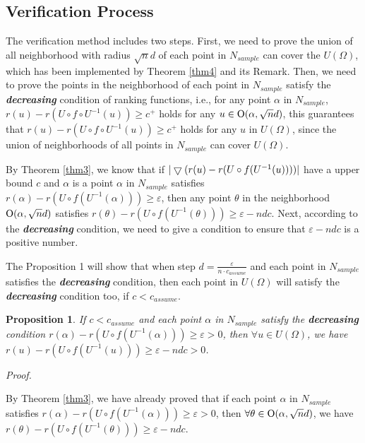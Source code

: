 \subsection{Verification Process} 
\label{Verification Process}
The verification method includes two steps. First, we need to prove the union of all neighborhood with radius $\sqrt n d$ of each point in $N_{sample}$ can cover the $U(\Omega )$, which has been implemented by Theorem \ref{thm4} and its Remark. Then, we need to prove the points in the neighborhood of each point in $N_{sample}$ satisfy the \textbf{\emph{decreasing}} condition of ranking functions, i.e., for any point $\alpha$ in $N_{sample}$, $r(u) - r(U \circ f \circ {U^{ - 1}}(u)) \ge c^+ $ holds for any $u \in {\rm O}(\alpha,\sqrt n d)$, this guarantees that $r(u) - r(U \circ f \circ {U^{ - 1}}(u)) \ge c^+ $ holds for any $u$ in $U(\Omega)$, since the union of neighborhoods of all points in $N_{sample}$ can cover $U(\Omega)$.

By Theorem \ref{thm3}, we know that if ${\rm{|}}\bigtriangledown(r(u) - r(U \circ f({U^{ - 1}}(u))))|$ have a upper bound $c$ and $\alpha$ is a point $\alpha $ in $N_{sample}$ satisfies $r(\alpha) - r(U \circ f({U^{ - 1}}(\alpha)))\ge \varepsilon$, then any point $\theta $ in the neighborhood ${\rm O}(\alpha,\sqrt n d)$ satisfies $r(\theta) - r(U \circ f({U^{ - 1}}(\theta)))\ge\varepsilon-ndc$. Next, according to the \textbf{\emph{decreasing}} condition, we need to give a condition to ensure that $\varepsilon-ndc$ is a positive number. 

The Proposition 1 will show that when step $d = \frac{\varepsilon }{{n\cdot{c_{assume}}}}$ and each point in ${N_{sample}}$ satisfies the \textbf{\emph{decreasing}} condition, then each point in $U(\Omega)$ will satisfy the \textbf{\emph{decreasing}} condition too, if $c < {c_{assume}}$.



\newtheorem{myprop}{Proposition}
\begin{myprop} \label{prop}
	If $c < {c_{assume}}$ and each point $\alpha $ in ${N_{sample}}$ satisfy the \textbf{\emph{decreasing}} condition $r(\alpha)-r(U \circ f({U^{ - 1}}(\alpha))) \ge \varepsilon  > 0$, then $\forall u  \in U(\Omega)$, we have $r(u)-r(U \circ f({U^{ - 1}}(u))) \ge \varepsilon  - ndc > 0$.
\end{myprop}
\emph{Proof.}

By Theorem \ref{thm3}, we have already proved that if each point $\alpha $ in ${N_{sample}}$ satisfies $r(\alpha)-r(U \circ f({U^{ - 1}}(\alpha))) \ge \varepsilon  > 0$, then $\forall \theta  \in {\rm O}(\alpha,\sqrt n d)$, we have $r(\theta)-r(U \circ f({U^{ - 1}}(\theta))) \ge \varepsilon  - ndc$.

